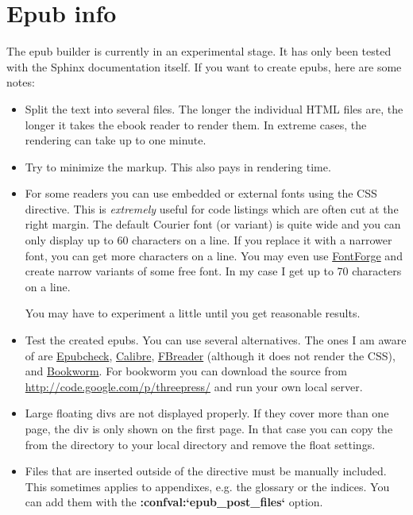 \documentclass[letterpaper,10pt,english]{sphinxmanual}
\begin{document}
\section{Epub info}
\label{faq:epub-faq}\label{faq:epub-info}
The epub builder is currently in an experimental stage.  It has only been tested
with the Sphinx documentation itself.  If you want to create epubs, here are
some notes:
\begin{itemize}
\item {} 
Split the text into several files. The longer the individual HTML files are,
the longer it takes the ebook reader to render them.  In extreme cases, the
rendering can take up to one minute.

\item {} 
Try to minimize the markup.  This also pays in rendering time.

\item {} 
For some readers you can use embedded or external fonts using the CSS
 directive.  This is \emph{extremely} useful for code listings which
are often cut at the right margin.  The default Courier font (or variant) is
quite wide and you can only display up to 60 characters on a line.  If you
replace it with a narrower font, you can get more characters on a line.  You
may even use \href{http://fontforge.sourceforge.net/}{FontForge} and create
narrow variants of some free font.  In my case I get up to 70 characters on a
line.

You may have to experiment a little until you get reasonable results.

\item {} 
Test the created epubs. You can use several alternatives.  The ones I am aware
of are \href{http://code.google.com/p/epubcheck/}{Epubcheck}, \href{http://calibre-ebook.com/}{Calibre}, \href{http://www.fbreader.org/}{FBreader} (although it does not render the CSS),
and \href{http://bookworm.oreilly.com/}{Bookworm}.  For bookworm you can download the source from
\url{http://code.google.com/p/threepress/} and run your own local server.

\item {} 
Large floating divs are not displayed properly.
If they cover more than one page, the div is only shown on the first page.
In that case you can copy the  from the
 directory to your local 
directory and remove the float settings.

\item {} 
Files that are inserted outside of the  directive must be manually
included. This sometimes applies to appendixes, e.g. the glossary or
the indices.  You can add them with the {\color{red}\bfseries{}:confval:{}`epub\_post\_files{}`} option.

\end{itemize}
\end{document}
